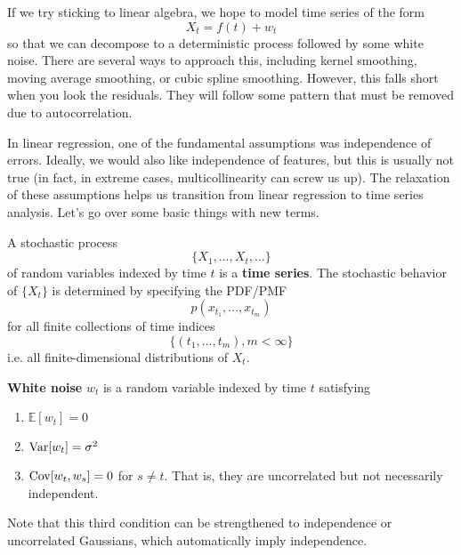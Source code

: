 If we try sticking to linear algebra, we hope to model time series of the form 
\begin{equation}
  X_t = f(t) + w_t
\end{equation}
so that we can decompose to a deterministic process followed by some white noise. There are several ways to approach this, including kernel smoothing, moving average smoothing, or cubic spline smoothing. However, this falls short when you look the residuals. They will follow some pattern that must be removed due to autocorrelation. 

In linear regression, one of the fundamental assumptions was  independence of errors. Ideally, we would also like independence of features, but this is usually not true (in fact, in extreme cases, multicollinearity can screw us up). The relaxation of these assumptions helps us transition from linear regression to time series analysis. Let's go over some basic things with new terms. 

\begin{definition}
  A stochastic process 
  \begin{equation}
    \{X_1, \ldots, X_t, \ldots \}
  \end{equation}
  of random variables indexed by time $t$ is a \textbf{time series}. The stochastic behavior of $\{X_t\}$ is determined by specifying the PDF/PMF 
  \begin{equation}
    p(x_{t_1}, \ldots, x_{t_m}) 
  \end{equation}
  for all finite collections of time indices 
  \begin{equation}
    \{(t_1, \ldots, t_m), m < \infty \}
  \end{equation}
  i.e. all finite-dimensional distributions of $X_t$. 
\end{definition}

\begin{definition}
  \textbf{White noise} $w_t$ is a random variable indexed by time $t$ satisfying 
  \begin{enumerate}
    \item $\mathbb{E}[w_t] = 0$
    \item $\Var[w_t] = \sigma^2$
    \item $\Cov[w_t, w_s] = 0$ for $s \neq t$. That is, they are uncorrelated but not necessarily independent. 
  \end{enumerate}
  Note that this third condition can be strengthened to independence or uncorrelated Gaussians, which automatically imply independence. 
\end{definition}

